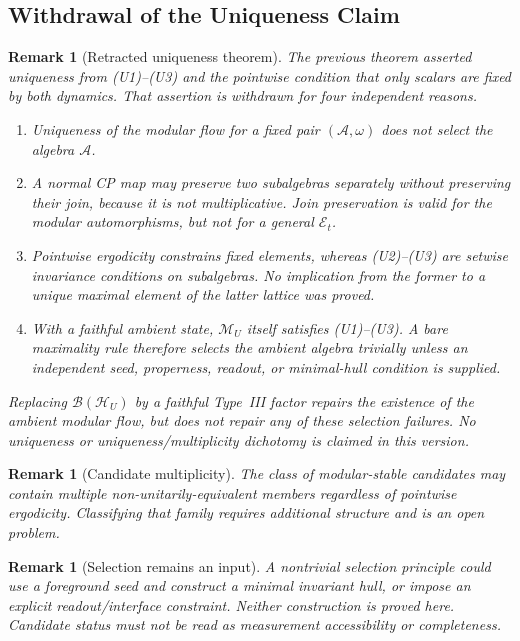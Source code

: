 \documentclass[12pt,a4paper,openany]{book}
\newtheorem{remark}[theorem]{Remark}
\begin{document}
\subsection{Withdrawal of the Uniqueness Claim}
\label{D-sec:modular-uniqueness}

\begin{remark}[Retracted uniqueness theorem]
\label{D-thm:uniqueness}
The previous theorem asserted uniqueness from (U1)--(U3) and the pointwise condition that only scalars are fixed by both dynamics.  That assertion is withdrawn for four independent reasons.
\begin{enumerate}
\item Uniqueness of the modular flow for a \emph{fixed pair} $(\mathcal A,\omega)$ does not select the algebra $\mathcal A$.
\item A normal CP map may preserve two subalgebras separately without preserving their join, because it is not multiplicative.  Join preservation is valid for the modular automorphisms, but not for a general $\mathcal E_t$.
\item Pointwise ergodicity constrains fixed elements, whereas (U2)--(U3) are setwise invariance conditions on subalgebras.  No implication from the former to a unique maximal element of the latter lattice was proved.
\item With a faithful ambient state, $\mathcal M_U$ itself satisfies (U1)--(U3).  A bare maximality rule therefore selects the ambient algebra trivially unless an independent seed, properness, readout, or minimal-hull condition is supplied.
\end{enumerate}
Replacing $\mathcal B(\mathcal H_U)$ by a faithful Type~III factor repairs the existence of the ambient modular flow, but does not repair any of these selection failures.  No uniqueness or uniqueness/multiplicity dichotomy is claimed in this version.
\end{remark}

\begin{remark}[Candidate multiplicity]
\label{D-rem:ergodicity}
The class of modular-stable candidates may contain multiple non-unitarily-equivalent members regardless of pointwise ergodicity.  Classifying that family requires additional structure and is an open problem.
\end{remark}

\begin{remark}[Selection remains an input]
A nontrivial selection principle could use a foreground seed and construct a minimal invariant hull, or impose an explicit readout/interface constraint.  Neither construction is proved here.  Candidate status must not be read as measurement accessibility or completeness.
\end{remark}
\end{document}
